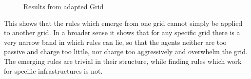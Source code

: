 \documentclass[a4paper]{article}
\begin{document}
\begin{figure}[!ht]
\caption{Results from adapted Grid}
\label{Result_exp_5}
\end{figure}
This shows that the rules which emerge from one grid cannot simply
be applied to another grid. In a broader sense it shows that for any specific grid there is a very narrow band in which rules can lie, 
so that the agents neither are too passive and charge too little, nor charge too aggressively and overwhelm the grid. The emerging rules
are trivial in their structure, while finding rules which work for specific infrastructures is not.
\end{document}
